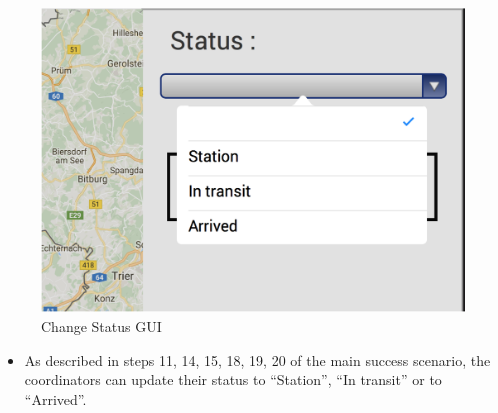 \begin{minipage}{0.72\textwidth}
\begin{figure}[H]
\caption{Change Status GUI}
\includegraphics[width=1.0\textwidth]{Ipad_status.eps}
\end{figure}
\end{minipage} \hfill
\begin{minipage}{0.23\textwidth}
\begin{itemize}
\item As described in steps 11, 14, 15, 18, 19, 20 of the main success scenario,
the coordinators can update their status to ``Station'', ``In
transit'' or to ``Arrived''.
\end{itemize}
\end{minipage}



